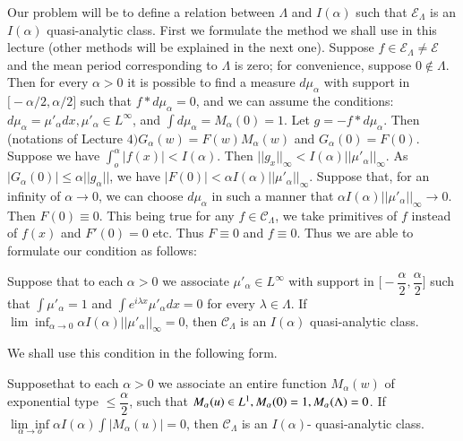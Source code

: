 Our problem will be to define a relation between $\Lambda$ and $I
(\alpha)$ such that $\mathscr{E}_\Lambda$ is an $I (\alpha)$
quasi-analytic class. First we formulate the method we shall use in
this lecture (other methods will be explained in the next
one). Suppose $f \in \mathscr{E}_\Lambda \neq \mathscr{E}$ and the
mean period corresponding to $\Lambda$ is zero; for convenience,
suppose $0 \notin \Lambda$. Then for every $\alpha > 0$ it is possible
to find a measure $d \mu_\alpha$ with support in $\big [- \alpha/ 2,
 \alpha/2 \big ]$ such that $f * d \mu_\alpha = 0$, and we can assume
the conditions: $d \mu_\alpha = \mu'_\alpha dx, \mu'_\alpha \in
L^\infty$, and $\int d \mu_\alpha = M_\alpha (0) = 1$. Let $g = - f *
d \mu_\alpha$. Then (notations of Lecture $4) G_\alpha (w) = F(w)
M_\alpha (w)$ and $G_\alpha (0) = F(0)$. Suppose we have
$\int^\alpha_o | f (x) | < I (\alpha)$. Then $|| g_x||_ \infty < I
(\alpha) || \mu'_\alpha ||_\infty$. As $\big | G_\alpha (0) \big |
\le \alpha || g_\alpha ||$, we have $\big | F(0) \big | < \alpha I
(\alpha) || \mu'_\alpha ||_\infty$. Suppose that, for an infinity of
$\alpha \to 0$, we can choose $d \mu_\alpha$ in such a manner that
$\alpha I (\alpha) || \mu'_\alpha ||_\infty \to 0$. Then $F(0) \equiv
0$. This being true for any $f \in \mathscr{C}_\Lambda$, we take
primitives of $f$ instead of $f (x)$ and $F'(0) = 0$ etc. Thus $F
\equiv 0$ and $f \equiv 0$. Thus we are able to formulate our
condition as follows: 

Suppose that to each $\alpha > 0$ we associate $\mu'_\alpha \in
L^\infty$ with support in $\big [ - \dfrac{\alpha}{2}, 
 \dfrac{\alpha}{2} \big]$ such that $\int \mu'_\alpha = 1$ and $\int
e^{i \lambda x} \mu'_\alpha dx = 0$ for every $\lambda \in
\Lambda$. If $\lim \inf_{\alpha \to 0} \alpha I (\alpha) ||
\mu'_\alpha ||_\infty = 0$, then $\mathscr{C}_\Lambda$ is an $I
(\alpha)$ quasi-analytic class. 

We shall use this condition in the following form.
\begin{lemma*}
 Suppose\pageoriginale that to each $\alpha > 0$ we associate an entire function
 $M_\alpha (w)$ of exponential type $\le \dfrac{\alpha}{2}$, such
 that $M_\alpha (u) \in L^1, M_\alpha (0) = 1,\break M_\alpha (\Lambda) = 0$. If
 $\underset{\alpha \to o}{\lim \inf} \alpha I (\alpha) \int |
 M_\alpha (u) | = 0$, then $\mathscr{C}_\Lambda$ is an $I (\alpha)$-
 quasi-analytic class. 
\end{lemma*}

